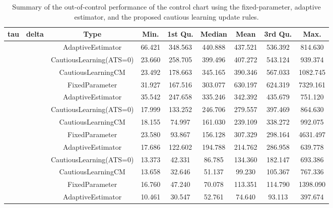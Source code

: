 \begin{table}[!h]

\caption{Summary of the out-of-control performance of the control chart using the fixed-parameter, adaptive estimator, and the proposed cautious learning update rules.}
\centering
\begin{tabular}[t]{ccccccccc}
\toprule
tau & delta & Type & Min. & 1st Qu. & Median & Mean & 3rd Qu. & Max.\\
\midrule
 &  & AdaptiveEstimator & 66.421 & 348.563 & 440.888 & 437.521 & 536.392 & 814.630\\

 &  & CautiousLearning(ATS=0) & 23.660 & 258.705 & 399.496 & 407.272 & 543.124 & 939.374\\

 &  & CautiousLearningCM & 23.492 & 178.663 & 345.165 & 390.346 & 567.033 & 1082.745\\

 & \multirow[t]{-4}{*}{\centering\arraybackslash 0.25} & FixedParameter & 31.927 & 167.516 & 303.077 & 630.197 & 624.319 & 7329.161\\
\cmidrule{2-9}
 &  & AdaptiveEstimator & 35.542 & 247.658 & 335.246 & 342.392 & 435.679 & 751.120\\

 &  & CautiousLearning(ATS=0) & 17.999 & 133.252 & 246.706 & 279.557 & 397.469 & 864.630\\

 &  & CautiousLearningCM & 18.155 & 74.997 & 161.030 & 239.109 & 338.272 & 992.075\\

 & \multirow[t]{-4}{*}{\centering\arraybackslash 0.35} & FixedParameter & 23.580 & 93.867 & 156.128 & 307.329 & 298.164 & 4631.497\\
\cmidrule{2-9}
 &  & AdaptiveEstimator & 17.686 & 122.602 & 194.788 & 214.762 & 286.958 & 639.778\\

 &  & CautiousLearning(ATS=0) & 13.373 & 42.331 & 86.785 & 134.360 & 182.147 & 693.386\\

 &  & CautiousLearningCM & 13.658 & 32.646 & 51.137 & 99.230 & 105.367 & 767.336\\

 & \multirow[t]{-4}{*}{\centering\arraybackslash 0.50} & FixedParameter & 16.760 & 47.240 & 70.078 & 113.351 & 114.790 & 1398.090\\
\cmidrule{2-9}
 &  & AdaptiveEstimator & 10.461 & 30.547 & 52.761 & 74.640 & 93.113 & 397.674\\


\end{tabular}
\end{table}
